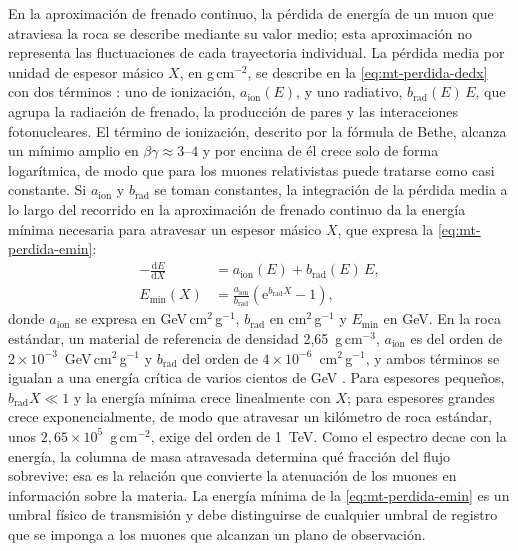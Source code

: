 En la aproximación de frenado continuo, la pérdida de energía de un muon que atraviesa la roca se describe mediante su valor medio; esta aproximación no representa las fluctuaciones de cada trayectoria individual. La pérdida media por unidad de espesor másico $X$, en g\,cm$^{-2}$, se describe en la \cref{eq:mt-perdida-dedx} con dos términos \parencite{groom2001,pdg2022}: uno de ionización, $a_{\mathrm{ion}}(E)$, y uno radiativo, $b_{\mathrm{rad}}(E)\,E$, que agrupa la radiación de frenado, la producción de pares y las interacciones fotonucleares. El término de ionización, descrito por la fórmula de Bethe, alcanza un mínimo amplio en $\beta\gamma\approx3$--$4$ y por encima de él crece solo de forma logarítmica, de modo que para los muones relativistas puede tratarse como casi constante. Si $a_{\mathrm{ion}}$ y $b_{\mathrm{rad}}$ se toman constantes, la integración de la pérdida media a lo largo del recorrido en la aproximación de frenado continuo da la energía mínima necesaria para atravesar un espesor másico $X$, que expresa la \cref{eq:mt-perdida-emin}:
\begin{subequations}\label{eq:mt-perdida}
\begin{align}
-\frac{\mathrm dE}{\mathrm dX}&=a_{\mathrm{ion}}(E)+b_{\mathrm{rad}}(E)\,E,\label{eq:mt-perdida-dedx}\\
E_{\min}(X)&=\frac{a_{\mathrm{ion}}}{b_{\mathrm{rad}}}\left(\mathrm e^{b_{\mathrm{rad}}X}-1\right),\label{eq:mt-perdida-emin}
\end{align}
\end{subequations}
donde $a_{\mathrm{ion}}$ se expresa en GeV\,cm$^{2}$\,g$^{-1}$, $b_{\mathrm{rad}}$ en cm$^{2}$\,g$^{-1}$ y $E_{\min}$ en GeV. En la roca estándar, un material de referencia de densidad 2,65~g\,cm$^{-3}$, $a_{\mathrm{ion}}$ es del orden de $2\times10^{-3}$~GeV\,cm$^{2}$\,g$^{-1}$ y $b_{\mathrm{rad}}$ del orden de $4\times10^{-6}$~cm$^{2}$\,g$^{-1}$, y ambos términos se igualan a una energía crítica de varios cientos de GeV \parencite{groom2001}. Para espesores pequeños, $b_{\mathrm{rad}}X\ll1$ y la energía mínima crece linealmente con $X$; para espesores grandes crece exponencialmente, de modo que atravesar un kilómetro de roca estándar, unos $2{,}65\times10^{5}$~g\,cm$^{-2}$, exige del orden de 1~TeV. Como el espectro decae con la energía, la columna de masa atravesada determina qué fracción del flujo sobrevive: esa es la relación que convierte la atenuación de los muones en información sobre la materia. La energía mínima de la \cref{eq:mt-perdida-emin} es un umbral físico de transmisión y debe distinguirse de cualquier umbral de registro que se imponga a los muones que alcanzan un plano de observación.

